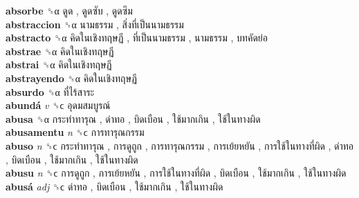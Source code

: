 \textbf{absorbe} ␝α   ดูด ,  ดูดซับ ,  ดูดซึม   \\
\textbf{abstraccion} ␝α   นามธรรม ,  สิ่งที่เป็นนามธรรม   \\
\textbf{abstracto} ␝α   คิดในเชิงทฤษฏี ,  ที่เป็นนามธรรม ,  นามธรรม ,  บทคัดย่อ   \\
\textbf{abstrae} ␝α   คิดในเชิงทฤษฏี   \\
\textbf{abstrai} ␝α   คิดในเชิงทฤษฏี   \\
\textbf{abstrayendo} ␝α   คิดในเชิงทฤษฏี   \\
\textbf{absurdo} ␝α   ที่ไร้สาระ   \\
\textbf{abundá} \emph{v}  ␝ϲ   อุดมสมบูรณ์   \\
\textbf{abusa} ␝α   กระทำทารุณ ,  ด่าทอ ,  บิดเบือน ,  ใช้มากเกิน ,  ใช้ในทางผิด   \\
\textbf{abusamentu} \emph{n}  ␝ϲ   การทารุณกรรม   \\
\textbf{abuso} \emph{n}  ␝ϲ   กระทำทารุณ ,  การดูถูก ,  การทารุณกรรม ,  การเย้ยหยัน ,  การใช้ในทางที่ผิด ,  ด่าทอ ,  บิดเบือน ,  ใช้มากเกิน ,  ใช้ในทางผิด   \\
\textbf{abusu} \emph{n}  ␝ϲ   การดูถูก ,  การเย้ยหยัน ,  การใช้ในทางที่ผิด ,  บิดเบือน ,  ใช้มากเกิน ,  ใช้ในทางผิด   \\
\textbf{abusá} \emph{adj}  ␝ϲ   ด่าทอ ,  บิดเบือน ,  ใช้มากเกิน ,  ใช้ในทางผิด   \\

